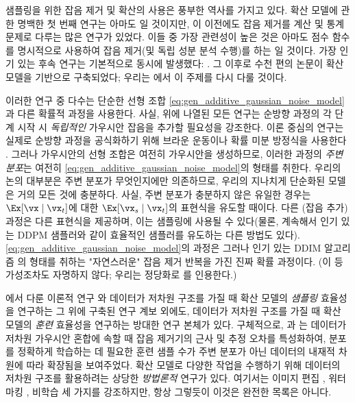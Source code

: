 \documentclass[../../book-main_ko.tex]{subfiles}
\begin{document}
샘플링을 위한 잡음 제거 및 확산의 사용은 풍부한 역사를 가지고 있다. 확산 모델에 관한 명백한 첫 번째 연구는 아마도 \cite{Sohl-Dickstein2015}일 것이지만, 이 이전에도 잡음 제거를 계산 및 통계 문제로 다루는 많은 연구가 있었다. 이들 중 가장 관련성이 높은 것은 아마도 점수 함수를 명시적으로 사용하여 잡음 제거(및 독립 성분 분석 수행)를 하는 \cite{hyvarinen05a}일 것이다. 가장 인기 있는 후속 연구는 기본적으로 동시에 발생했다: \cite{ho2020denoising,song2019}. 그 이후로 수천 편의 논문이 확산 모델을 기반으로 구축되었다; 우리는 에서 이 주제를 다시 다룰 것이다.

이러한 연구 중 다수는 단순한 선형 조합 \eqref{eq:gen_additive_gaussian_noise_model}과 다른 확률적 과정을 사용한다. 사실, 위에 나열된 모든 연구는 순방향 과정의 각 단계 시작 시 \textit{독립적인} 가우시안 잡음을 추가할 필요성을 강조한다. 이론 중심의 연구는 실제로 순방향 과정을 공식화하기 위해 브라운 운동이나 확률 미분 방정식을 사용한다 \cite{song2020score}. 그러나 가우시안의 선형 조합은 여전히 가우시안을 생성하므로, 이러한 과정의 \textit{주변 분포}는 여전히 \eqref{eq:gen_additive_gaussian_noise_model}의 형태를 취한다. 우리의 논의 대부분은 주변 분포가 무엇인지에만 의존하므로, 우리의 지나치게 단순화된 모델은 거의 모든 것에 충분하다. 사실, 주변 분포가 충분하지 않은 유일한 경우는 \(\Ex[\vx \mid \vx_{t}]\)에 대한 \(\Ex[\vx_{s} \mid \vx_{t}]\)의 표현식을 유도할 때이다. 다른 (잡음 추가) 과정은 다른 표현식을 제공하며, 이는 샘플링에 사용될 수 있다(물론, 계속해서 인기 있는 DDPM 샘플러와 같이 효율적인 샘플러를 유도하는 다른 방법도 있다). \eqref{eq:gen_additive_gaussian_noise_model}의 과정은 그러나 인기 있는 DDIM 알고리즘 \cite{song2020denoising}의 형태를 취하는 "자연스러운" 잡음 제거 반복을 가진 진짜 확률 과정이다. (이 등가성조차도 자명하지 않다; 우리는 정당화로 \cite{de2025distributional}를 인용한다.)



에서 다룬 이론적 연구 \citep{li2024d}와 데이터가 저차원 구조를 가질 때 확산 모델의 \textit{샘플링} 효율성을 연구하는 그 위에 구축된 연구 계보 외에도, 데이터가 저차원 구조를 가질 때 확산 모델의 \textit{훈련} 효율성을 연구하는 방대한 연구 본체가 있다. 구체적으로, \citet{chen2023score}과 \citep{wang2024diffusion}는 데이터가 저차원 가우시안 혼합에 속할 때 잡음 제거기의 근사 및 추정 오차를 특성화하여, 분포를 정확하게 학습하는 데 필요한 훈련 샘플 수가 주변 분포가 아닌 데이터의 내재적 차원에 따라 확장됨을 보여주었다. 확산 모델로 다양한 작업을 수행하기 위해 데이터의 저차원 구조를 활용하려는 상당한 \textit{방법론적} 연구가 있다. 여기서는 이미지 편집 \citep{chen2024exploring}, 워터마킹 \citep{li2024shallow}, 비학습 \citep{chen2025dual} 세 가지를 강조하지만, 항상 그렇듯이 이것은 완전한 목록은 아니다.
 
\end{document}
